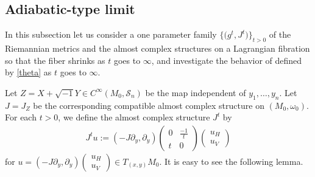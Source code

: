 \documentclass[pdftex]{sigma}
\numberwithin{equation}{section}
\begin{document}
\subsection{Adiabatic-type limit}\label{adiabatic limit}
In this subsection let us consider a one parameter family $\big\{\bigl(g^t, J^t\bigr)\big\}_{t>0}$ of the Riemannian metrics and the almost complex structures on a Lagrangian fibration so that the fiber shrinks as $t$ goes to $\infty$, and investigate the behavior of  defined by \eqref{theta} as $t$ goes to $\infty$.

Let $Z=X+\sqrt{-1}Y\in C^\infty ( M_0,{\mathcal S}_n)$ be the map independent of $y_1, \ldots ,y_n$. Let $J=J_Z$ be the corresponding compatible almost complex structure on $(M_0,\omega_0)$. For each $t>0$, we define the almost complex structure $J^t$ by
\begin{align*}
J^tu:=( -J\partial_y, \partial_y)
\begin{pmatrix}
0 & \frac{-1}{t}\\
t & 0
\end{pmatrix}
\begin{pmatrix}
u_H\\
u_V
\end{pmatrix}
\end{align*}
for $u=(-J\partial_y, \partial_y)
\left(\begin{smallmatrix}
u_H\\
u_V
\end{smallmatrix}\right)\in T_{(x,y)}M_0$. It is easy to see the following lemma.
\end{document}
